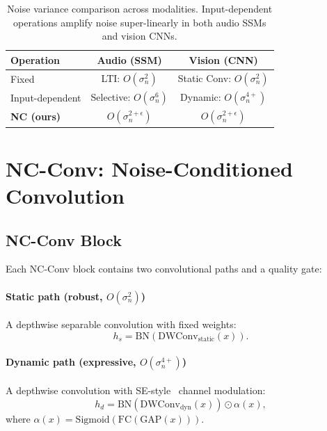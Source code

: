 \documentclass[journal]{IEEEtran}
\begin{document}
\begin{table}[t]
\centering
\caption{Noise variance comparison across modalities. Input-dependent operations amplify noise super-linearly in both audio SSMs and vision CNNs.}
\label{tab:noise_theory}
\small
\begin{tabular}{@{}lcc@{}}
\toprule
\textbf{Operation} & \textbf{Audio (SSM)} & \textbf{Vision (CNN)} \\
\midrule
Fixed & LTI: $O(\sigma_n^2)$ & Static Conv: $O(\sigma_n^2)$ \\
Input-dependent & Selective: $O(\sigma_n^6)$ & Dynamic: $O(\sigma_n^{4+})$ \\
\textbf{NC (ours)} & $O(\sigma_n^{2+\epsilon})$ & $O(\sigma_n^{2+\epsilon})$ \\
\bottomrule
\end{tabular}
\end{table}


\section{NC-Conv: Noise-Conditioned Convolution}
\label{sec:ncconv}

\subsection{NC-Conv Block}

Each NC-Conv block contains two convolutional paths and a quality gate:

\paragraph{Static path (robust, $O(\sigma_n^2)$)}
A depthwise separable convolution with fixed weights:
\begin{equation}
h_s = \text{BN}(\text{DWConv}_{\text{static}}(x)).
\end{equation}

\paragraph{Dynamic path (expressive, $O(\sigma_n^{4+})$)}
A depthwise convolution with SE-style~\cite{hu2018squeeze} channel modulation:
\begin{equation}
h_d = \text{BN}(\text{DWConv}_{\text{dyn}}(x)) \odot \alpha(x),
\end{equation}
where $\alpha(x) = \text{Sigmoid}(\text{FC}(\text{GAP}(x)))$.
\end{document}

